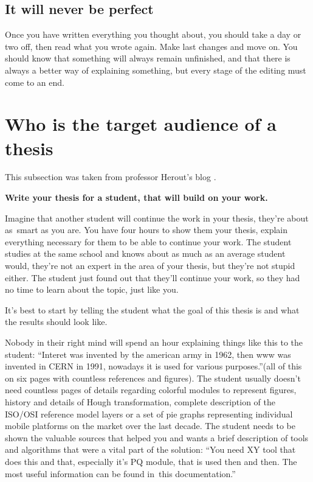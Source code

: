 \subsection*{It will never be perfect}
Once you have written everything you thought about, you should take a day or two off, then read what you wrote again. Make last changes and move on. You should know that something will always remain unfinished, and that there is always a better way of explaining something, but every stage of the editing must come to an end.

\section{Who is the target audience of a thesis}

This subsection was taken from professor Herout's blog \cite{Herout}.

\bigskip
\noindent \bf Write your thesis for a student, that will build on your work. \rm
\bigskip

Imagine that another student will continue the work in your thesis, they're about as~smart as you are. You have four hours to show them your thesis, explain everything necessary for them to be able to continue your work. The student studies at the same school and knows about as much as an average student would, they're not an expert in the area of your thesis, but they're not stupid either. The student just found out that they'll continue your work, so they had no time to learn about the topic, just like you.

It's best to start by telling the student what the goal of this thesis is and what the results should look like.

Nobody in their right mind will spend an hour explaining things like this to the student: ``{\mbox{Interet} was invented by the american army in 1962, then www was invented in CERN in 1991, nowadays it is used for various purposes.''}(all of this on six pages with countless references and figures).
The student usually doesn't need countless pages of details regarding colorful modules to represent figures, history and details of Hough transformation, complete description of the ISO/OSI reference model layers or a set of pie graphs representing individual mobile platforms on the market over the last decade.
The student needs to be shown the valuable sources that helped you and wants a brief description of tools and algorithms that were a vital part of the solution: ``{You need XY tool that does this and that, especially it's PQ module, that is used then and then. The most useful information can be found in~this documentation.}''

